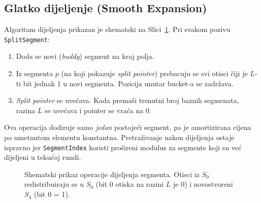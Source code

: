 \documentclass[12pt,a4paper]{article}
\begin{document}
\subsection{Glatko dijeljenje (Smooth Expansion)}
\label{sec:split}
Algoritam dijeljenja prikazan je shematski na Slici~\ref{fig:split}. Pri svakom pozivu
\texttt{SplitSegment}:
\begin{enumerate}
    \item Doda se novi (\emph{buddy}) segment na kraj polja.
    \item Iz segmenta $p$ (na koji pokazuje \emph{split pointer}) prebacuju se svi
          otisci čiji je $L$-ti bit jednak 1 u novi segmenta. Pozicija unutar bucket-a
          se zadržava.
    \item \emph{Split pointer} se uvećava. Kada premaši trenutni broj baznih segmenata,
          razina $L$ se uvećava i pointer se vraća na 0.
\end{enumerate}
Ova operacija dodiruje samo \emph{jedan} postojeći segment, pa je amortizirana cijena
po umetnutom elementu konstantna. Pretraživanje nakon dijeljenja ostaje ispravno jer
\texttt{SegmentIndex} koristi prošireni modulus za segmente koji su već dijeljeni u
tekućoj rundi.

\begin{figure}[H]
    \centering
    \caption{Shematski prikaz operacije dijeljenja segmenta. Otisci iz $S_0$
    redistribuiraju se u $S_0$ (bit 0 otiska na razini $L$ je 0) i novostvoreni $S_4$
    (bit 0 = 1).}
    \label{fig:split}
\end{figure}
\end{document}
